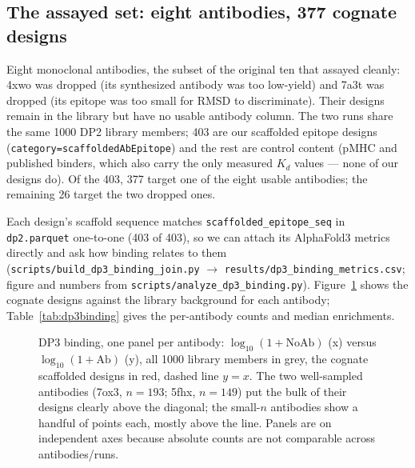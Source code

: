 \subsection{The assayed set: eight antibodies, 377 cognate designs}
Eight monoclonal antibodies, the subset of the original ten that assayed cleanly: 4xwo was
dropped (its synthesized antibody was too low-yield) and 7a3t was dropped (its epitope was too
small for RMSD to discriminate). Their designs remain in the library but have no usable
antibody column. The two runs share the same \num{1000} DP2 library members; \num{403} are our
scaffolded epitope designs (\texttt{category=scaffoldedAbEpitope}) and the rest are control
content (pMHC and published binders, which also carry the only measured $K_d$ values --- none
of our designs do). Of the \num{403}, \num{377} target one of the eight usable antibodies; the
remaining \num{26} target the two dropped ones.

Each design's scaffold sequence matches \texttt{scaffolded\_epitope\_seq} in \texttt{dp2.parquet}
one-to-one (\num{403} of \num{403}), so we can attach its AlphaFold3 metrics directly and ask
how binding relates to them (\texttt{scripts/build\_dp3\_binding\_join.py} $\rightarrow$
\texttt{results/dp3\_binding\_metrics.csv}; figure and numbers from
\texttt{scripts/analyze\_dp3\_binding.py}). Figure~\ref{fig:dp3binding} shows the cognate
designs against the library background for each antibody; Table~\ref{tab:dp3binding} gives the
per-antibody counts and median enrichments.

\begin{figure}[h]\centering
{}
\caption{DP3 binding, one panel per antibody: $\log_{10}(1+\text{NoAb})$ (x) versus
$\log_{10}(1+\text{Ab})$ (y), all \num{1000} library members in grey, the cognate scaffolded
designs in red, dashed line $y=x$. The two well-sampled antibodies (7ox3, $n=\num{193}$; 5fhx,
$n=\num{149}$) put the bulk of their designs clearly above the diagonal; the small-$n$
antibodies show a handful of points each, mostly above the line. Panels are on independent axes
because absolute counts are not comparable across antibodies/runs.}
\label{fig:dp3binding}
\end{figure}

